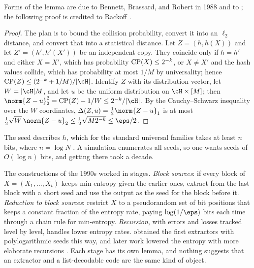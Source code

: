 \begin{refsection}
Forms of the lemma are due to Bennett, Brassard, and Robert in 1988 and to \textcite{ImpagliazzoLevinLuby1989}; the following proof is credited to Rackoff \parencite[\S6.5]{Vadhan2012}.

\begin{proof}
The plan is to bound the collision probability, convert it into an $\ell_2$ distance, and convert that into a statistical distance. Let $Z=(h,h(X))$ and let $Z'=(h',h'(X'))$ be an independent copy. They coincide only if $h=h'$ and either $X=X'$, which has probability $\operatorname{CP}(X)\le2^{-k}$, or $X\ne X'$ and the hash values collide, which has probability at most $1/M$ by universality; hence $\pseudorandomCP(Z)\le(2^{-k}+1/M)/|\cH|$. Identify $Z$ with its distribution vector, let $W=|\cH|M$, and let $u$ be the uniform distribution on $\cH\times[M]$; then $\norm{Z-u}_2^2=\pseudorandomCP(Z)-1/W\le2^{-k}/|\cH|$. By the Cauchy--Schwarz inequality over the $W$ coordinates, $\Delta(Z,u)=\frac12\norm{Z-u}_1$ is at most $\frac12\sqrt W\,\norm{Z-u}_2\le\frac12\sqrt{M2^{-k}}\le\eps/2$.
\end{proof}

The seed describes $h$, which for the standard universal families takes at least $n$ bits, where $n=\log N$ \parencite[\S6.2]{Vadhan2012}. A simulation enumerates all seeds, so one wants seeds of $O(\log n)$ bits, and getting there took a decade.

\begin{aside}
The constructions of the 1990s worked in stages. \emph{Block sources}: if every block of $X=(X_1,\dots,X_t)$ keeps min-entropy given the earlier ones, extract from the last block with a short seed and use the output as the seed for the block before it. \emph{Reduction to block sources}: restrict $X$ to a pseudorandom set of bit positions that keeps a constant fraction of the entropy rate, paying $\log(1/\eps)$ bits each time through a chain rule for min-entropy. \emph{Recursion}, with errors and losses tracked level by level, handles lower entropy rates. \textcite{NisanZuckerman1996} obtained the first extractors with polylogarithmic seeds this way, and later work lowered the entropy with more elaborate recursions \parencite[\S6.3 and \S6.5]{Vadhan2012}. Each stage has its own lemma, and nothing suggests that an extractor and a list-decodable code are the same kind of object.
\end{aside}


\end{refsection}
